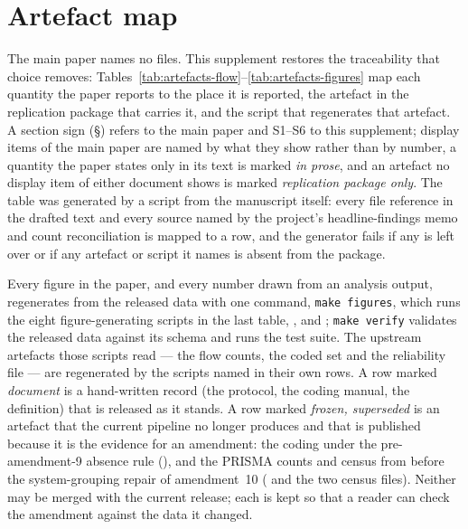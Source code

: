 \section{Artefact map}
\label{app:artefacts}

The main paper names no files. This supplement restores the traceability that choice removes:
Tables~\ref{tab:artefacts-flow}--\ref{tab:artefacts-figures} map each quantity the paper reports to
the place it is reported, the artefact in the replication package that carries it, and the script that
regenerates that artefact. A section sign (\S) refers to the main paper and S1--S6 to this supplement;
display items of the main paper are named by what they show rather than by number, a quantity the paper
states only in its text is marked \emph{in prose}, and an artefact no display item of either document
shows is marked \emph{replication package only}. The table was
generated by a script from the manuscript itself: every file reference in the drafted text and every
source named by the project's headline-findings memo and count reconciliation is mapped to a row, and
the generator fails if any is left over or if any artefact or script it names is absent from the
package.

Every figure in the paper, and every number drawn from an analysis output, regenerates from the
released data with one command, \texttt{make figures}, which runs the eight figure-generating scripts
in the last table, ,  and
; \texttt{make verify} validates the
released data against its schema and runs the test suite. The upstream artefacts those scripts read
--- the flow counts, the coded set and the reliability file --- are regenerated by the scripts named in
their own rows. A row marked \emph{document} is a hand-written record (the protocol, the coding manual,
the definition) that is released as it stands. A row marked \emph{frozen, superseded} is an artefact
that the current pipeline no longer produces and that is published because it is the evidence for an
amendment: the coding under the pre-amendment-9 absence rule
(), and the PRISMA counts and census from before the
system-grouping repair of amendment~10 ( and the two
 census files). Neither may be merged with the current release; each is kept so that
a reader can check the amendment against the data it changed.


